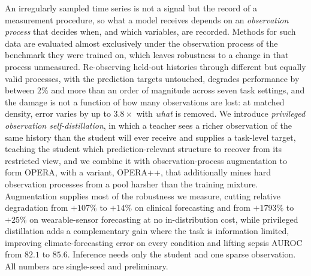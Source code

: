
An irregularly sampled time series is not a signal but the record of a measurement procedure, so what a model
receives depends on an \emph{observation process} that decides when, and which variables, are recorded. Methods
for such data are evaluated almost exclusively under the observation process of the benchmark they were trained
on, which leaves robustness to a change in that process unmeasured. Re-observing held-out histories through
different but equally valid processes, with the prediction targets untouched, degrades performance by between
$2\%$ and more than an order of magnitude across seven task settings, and the damage is not a function of how
many observations are lost: at matched density, error varies by up to $3.8\times$ with \emph{what} is removed. We
introduce \emph{privileged observation self-distillation}, in which a teacher sees a richer observation of the
same history than the student will ever receive and supplies a task-level target, teaching the student which
prediction-relevant structure to recover from its restricted view, and we combine it with observation-process
augmentation to form OPERA, with a variant, OPERA++, that additionally mines hard observation processes from a
pool harsher than the training mixture. Augmentation supplies most of the robustness we
measure, cutting relative degradation from $+107\%$ to $+14\%$ on clinical forecasting and from $+1793\%$ to
$+25\%$ on wearable-sensor forecasting at no in-distribution cost, while privileged distillation adds a
complementary gain where the task is information limited, improving climate-forecasting error on every condition
and lifting sepsis AUROC from $82.1$ to $85.6$. Inference needs only the student and one sparse observation.
\prelim All numbers are single-seed and preliminary. 
